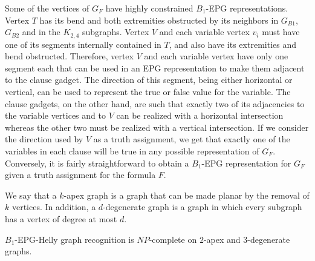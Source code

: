 \documentclass[runningheads]{llncs}
\begin{document}
Some of the vertices of $G_F$ have highly constrained $B_1$-EPG representations. Vertex $T$ has its bend	and both extremities	obstructed	by its neighbors in	$G_{B1}$, $G_{B2}$ and in the $K_{2,4}$
subgraphs. Vertex $V$ and each variable vertex $v_i$ must have one of its segments internally contained in $T$, and also have its extremities and bend obstructed.  Therefore, vertex $V$ and each
variable vertex have only one segment each that can be used in an EPG
representation to make them adjacent to the clause gadget. The direction of
this segment, being either horizontal	or vertical, can be used to represent
the true or false value	for the	variable.
The clause gadgets, on the other hand, are such that exactly two of its
adjacencies to the variable vertices and to $V$ can be realized with a
horizontal intersection whereas  the other two must be realized with a
vertical intersection. If we consider the direction used by $V$ as a
truth assignment, we get that exactly one of the variables in each clause
will be	true in	any possible representation of $G_F$. Conversely, it is	fairly
straightforward to obtain a $B_1$-EPG representation for $G_F$ given a truth assignment	for
the formula $F$.

\smallskip

We say that a $k$-apex graph is a graph that can be made planar by the removal of $k$ vertices. In addition, a $d$-degenerate graph is a graph in which every subgraph has a vertex of degree at most $d$.

\begin{corollary}\label{coro:2apexAnd3degenerate}
{\sc $B_{1}$-EPG-Helly graph recognition} is $NP$-complete on $2$-apex and $3$-degenerate graphs.
\end{corollary}

\vspace{-0.3cm}




\end{document}
